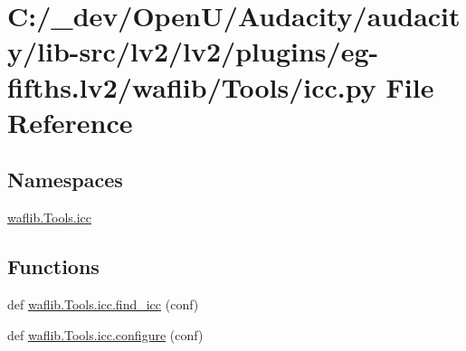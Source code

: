 \hypertarget{lv2_2plugins_2eg-fifths_8lv2_2waflib_2_tools_2icc_8py}{}\section{C\+:/\+\_\+dev/\+Open\+U/\+Audacity/audacity/lib-\/src/lv2/lv2/plugins/eg-\/fifths.lv2/waflib/\+Tools/icc.py File Reference}
\label{lv2_2plugins_2eg-fifths_8lv2_2waflib_2_tools_2icc_8py}
\subsection*{Namespaces}
\begin{DoxyCompactItemize}
\item 
 \hyperlink{namespacewaflib_1_1_tools_1_1icc}{waflib.\+Tools.\+icc}
\end{DoxyCompactItemize}
\subsection*{Functions}
\begin{DoxyCompactItemize}
\item 
def \hyperlink{namespacewaflib_1_1_tools_1_1icc_ac87401e53461cf3742295c6ca369977a}{waflib.\+Tools.\+icc.\+find\+\_\+icc} (conf)
\item 
def \hyperlink{namespacewaflib_1_1_tools_1_1icc_a29b371f4c4eaba47d7b198073638bfd9}{waflib.\+Tools.\+icc.\+configure} (conf)
\end{DoxyCompactItemize}

